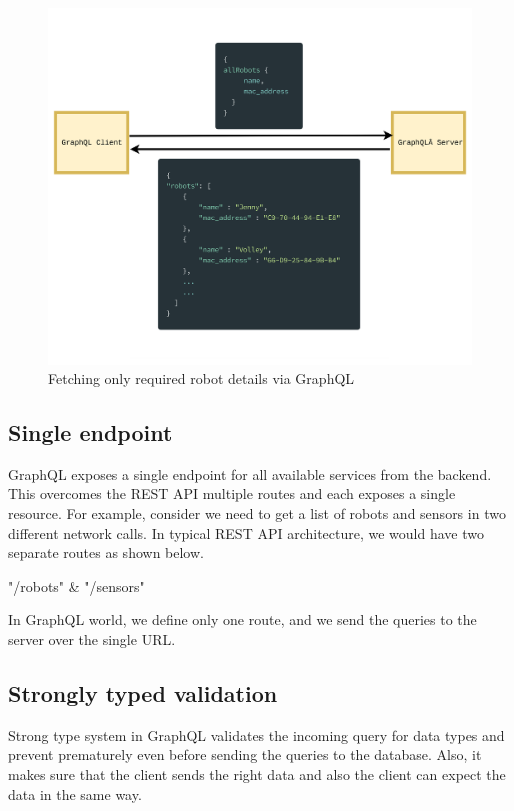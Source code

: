 	\begin{figure}[!htbp] 
		\begin{center}
			\includegraphics[trim={0 0 0 2cm},clip,scale=0.07]{./images/png/graphql_declarative}	
			\caption{Fetching only required robot details via GraphQL}	
			\label{fig:graphql_declarative}	
		\end{center}
	\end{figure}

	\subsection{Single endpoint}
	
	GraphQL exposes a single endpoint for all available services from the backend. This overcomes the REST API multiple routes and each exposes a single resource. For example, consider we need to get a list of robots and sensors in two different network calls. In typical REST API architecture, we would have two separate routes as shown below.
	
	"/robots" \& "/sensors"
	
	In GraphQL world, we define only one route, and we send the queries to the server over the single URL.
	
	\subsection{Strongly typed validation}
	Strong type system in GraphQL validates the incoming query for data types and prevent prematurely even before sending the queries to the database. Also, it makes sure that the client sends the right data and also the client can expect the data in the same way. 
	
